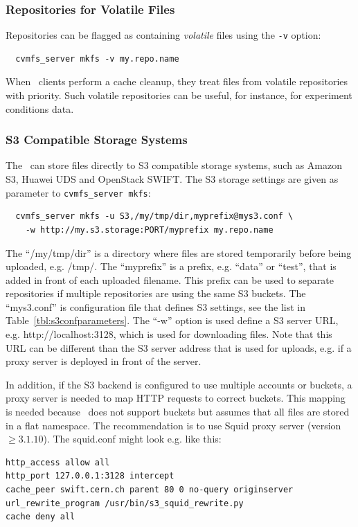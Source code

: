 \subsubsection{Repositories for Volatile Files}
Repositories can be flagged as containing \emph{volatile} files using the \texttt{-v} option:
\begin{verbatim}
  cvmfs_server mkfs -v my.repo.name
\end{verbatim}
When \cvmfs\ clients perform a cache cleanup, they treat files from volatile repositories with priority.
Such volatile repositories can be useful, for instance, for experiment conditions data.

\subsubsection{S3 Compatible Storage Systems}

The \cvmfs\ can store files directly to S3 compatible storage
systems, such as Amazon S3, Huawei UDS and OpenStack SWIFT. The S3 storage
settings are given as parameter to \texttt{cvmfs\_server mkfs}:
\begin{verbatim}
  cvmfs_server mkfs -u S3,/my/tmp/dir,myprefix@mys3.conf \
    -w http://my.s3.storage:PORT/myprefix my.repo.name
\end{verbatim}

The ``/my/tmp/dir'' is a directory where files are stored temporarily
before being uploaded, e.g. /tmp/. The ``myprefix'' is a prefix,
e.g. ``data'' or ``test'', that is added in front of each uploaded
filename. This prefix can be used to separate repositories if multiple
repositories are using the same S3 buckets. The ``mys3.conf'' is
configuration file that defines S3 settings, see the list in
Table~\ref{tbl:s3confparameters}. The ``-w'' option is used define a
S3 server URL, e.g. http://localhost:3128, which is used for
downloading files. Note that this URL can be different than the S3
server address that is used for uploads, e.g. if a proxy server is
deployed in front of the server.


In addition, if the S3 backend is configured to use multiple accounts or buckets,
a proxy server is needed to map HTTP requests to correct buckets.
This mapping is needed because \cvmfs\ does not support buckets but assumes
that all files are stored in a flat namespace. The recommendation is to use Squid proxy
server (version $\geq 3.1.10$). The squid.conf might look e.g. like this:
\begin{verbatim}
http_access allow all
http_port 127.0.0.1:3128 intercept
cache_peer swift.cern.ch parent 80 0 no-query originserver
url_rewrite_program /usr/bin/s3_squid_rewrite.py
cache deny all
\end{verbatim}

